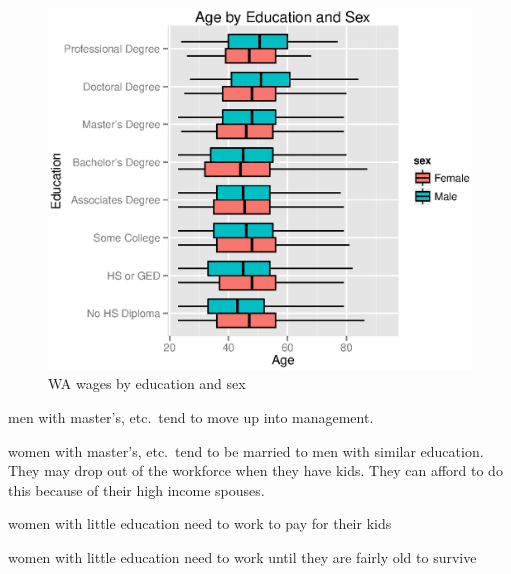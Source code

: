 \documentclass{exam}
\begin{document}
  \begin{figure}[H]
    \centering
    \includegraphics{figures/wa_age_by_education_and_sex.eps}
    \caption{WA wages by education and sex}
  \end{figure}

  \begin{itemize*}
    \item men with master's, etc.\ tend to move up into management. 

    \item women with master's, etc.\ tend to be married to men with similar education.  They may
      drop out of the workforce when they have kids.  They can afford to do this because of their
      high income spouses.

    \item women with little education need to work to pay for their kids

    \item women with little education need to work until they are fairly old to survive

  \end{itemize*}
\end{document}
